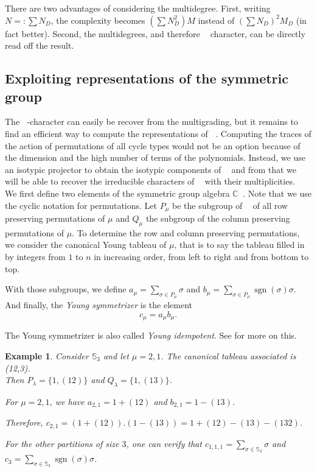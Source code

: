 \documentclass[letter,12pt]{article}
\newcommand{\CC}{\mathbb{C}}
\newcommand{\Sym}[1]{\mathbb{S}_{#1}}
\DeclareMathOperator{\Sn}{\mathbb{S}_n}
\DeclareMathOperator{\GLr}{GL_r}
\DeclareMathOperator{\sgn}{sgn}
\newtheorem{example}{Example}
\newcommand{\tableau}{\YFrench \Yboxdim{10pt}\young}
\begin{document}
	There are two advantages of considering the multidegree. 
	First, writing $N=:\sum N_D$, the complexity becomes $(\sum N_D^2) M$ instead of $(\sum N_D)^2M_D$ (in fact better).
	Second, the multidegrees, and therefore $\GLr$ character, can be directly read off the result.
	
	\subsection{Exploiting representations of the symmetric group}
	
	The $\GLr$-character can easily be recover from the multigrading, but it remains to find an efficient way to compute the representations of $\Sn$. Computing the traces of the action of permutations of all cycle types would not be an option because of the dimension and the high number of terms of the polynomials. 
	Instead, we use an isotypic projector to obtain the isotypic components of $\Sn$ and from that we will be able to recover the irreducible characters of $\Sn$ with their multiplicities. \\
	
	We first define two elements of the symmetric group algebra $\CC \Sn$. Note that we use the cyclic notation for permutations.
	Let $P_{\mu}$ be the subgroup of $\Sn$ of all row preserving permutations of $\mu$ and $Q_{\mu}$ the subgroup of the column preserving permutations of $\mu$. To determine the row and column preserving permutations, we consider the canonical Young tableau of $\mu$, that is to say the tableau filled in by integers from $1$ to $n$ in increasing order, from left to right and from bottom to top. 
	
	With those subgroups, we define $a_{\mu} = \sum_{\sigma \in P_{\mu}} \sigma$ and  $b_{\mu} = \sum_{\sigma \in P_{\mu}} \sgn(\sigma) \sigma$. And finally, the \emph{Young symmetrizer} is the element $$c_{\mu} = a_{\mu} b_{\mu}.$$
	
	The Young symmetrizer is also called \emph{Young idempotent}. See \cite{FultonHarris1991} for more on this. 
	
	\begin{example} Consider $\Sym{3}$ and let $\mu = 2,1$.
		The canonical tableau associated is \tableau(12,3).\\
		Then $P_\lambda = \{1, (12)\}$ and $Q_\lambda = \{1, (13)\}$. 
		 
		For $\mu=2,1$, we have
		$a_{2,1} = 1 + (12)$ and
		$b_{2,1} = 1 - (13)$. 
		
		Therefore, $c_{2,1} = (1 + (12)) . (1 - (13)) = 1 + (12) - (13) - (132)$. 
		
		For the other partitions of size $3$, one can verify that 
		$c_{1,1,1} = \sum_{\sigma \in \Sym{3}} \sigma$ and 
		$c_{3} = \sum_{\sigma \in \Sym{3}} \sgn(\sigma)\sigma$.
	\end{example}
	
\end{document}
